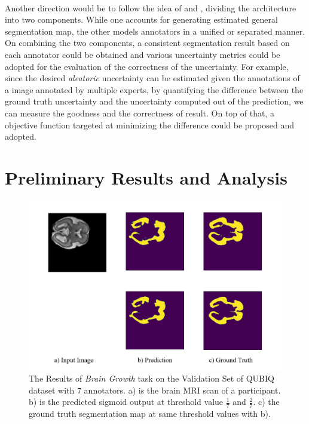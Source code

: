 \documentclass[12pt]{extarticle}
\begin{document}
\paragraph{}
Another direction would be to follow the idea of \cite{zhang2020disentangling} and \cite{kohl2019probabilistic}, 
dividing the architecture into two components. 
While one accounts for generating estimated general segmentation map,
the other models annotators in a unified or separated manner. On combining the two components, a consistent segmentation
result based on each annotator could be obtained and various uncertainty metrics could be adopted for
the evaluation of the correctness of the uncertainty. For example, since the desired \textit{aleatoric} uncertainty can be 
estimated given the annotations of a image annotated by multiple experts\cite{qubiq}, 
by quantifying the difference between the ground truth uncertainty and 
the uncertainty computed out of the prediction, we can measure the goodness and the correctness of
result. On top of that, a objective function targeted at minimizing the difference could be proposed and adopted.

\paragraph{}
\section{Preliminary Results and Analysis}
\begin{figure}[h!]
\centering
\includegraphics[scale=0.3]{fig1.jpg}
\caption{The Results of \textit{Brain Growth} task on the Validation Set of QUBIQ dataset with 7 annotators. a) is the brain 
MRI scan of a participant. b) is the predicted sigmoid output at threshold value $\frac{1}{7}$ and $\frac{2}{7}$. c) the 
ground truth segmentation map at same threshold values with b).}
\end{figure}
\end{document}
